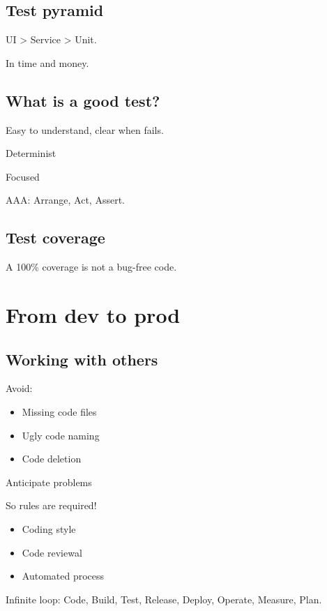 \documentclass[a4paper,11pt]{article}
\newcommand{\ls}{\begin{itemize}}
\newcommand{\li}{\item}
\newcommand{\lend}{\end{itemize}}
\begin{document}
\subsection{Test pyramid}

UI > Service > Unit.

In time and money.

\subsection{What is a good test?}

Easy to understand, clear when fails.

Determinist

Focused

AAA: Arrange, Act, Assert.

\subsection{Test coverage}

A 100\% coverage is not a bug-free code.

\section{From dev to prod}

\subsection{Working with others}

Avoid:

\ls
\li Missing code files
\li Ugly code naming
\li Code deletion
\lend

Anticipate problems

So rules are required!
\ls
\li Coding style
\li Code reviewal
\li Automated process
\lend

Infinite loop: Code, Build, Test, Release, Deploy, Operate, Measure, Plan.
\end{document}
